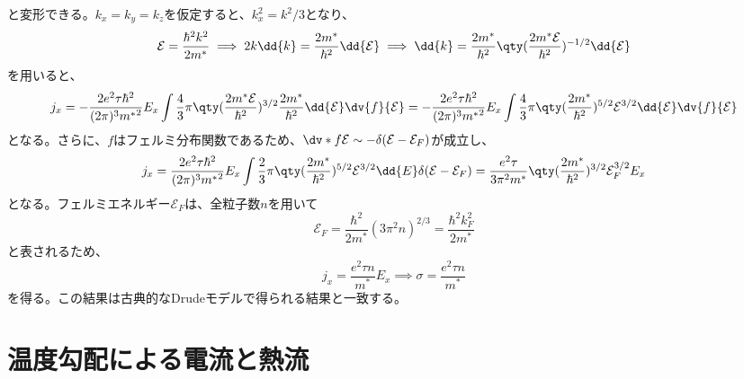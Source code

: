 と変形できる。$k_x=k_y=k_z$を仮定すると、$k_x^2 = k^2/3$となり、
\begin{equation}
	\mathcal{E} = \frac{\hbar^2k^2}{2m^*} \implies 2k\dd{k} = \frac{2m^*}{\hbar^2}\dd{\mathcal{E}} \implies \dd{k} = \frac{2m^*}{\hbar^2}\qty(\frac{2m^*\mathcal{E}}{\hbar^2})^{-1/2}\dd{\mathcal{E}}
\end{equation}
を用いると、
\begin{equation}
	j_x = -\frac{2e^2\tau\hbar^2}{(2\pi)^3{m^*}^2}E_x\int\frac{4}{3}\pi{}\qty(\frac{2m^*\mathcal{E}}{\hbar^2})^{3/2}\frac{2m^*}{\hbar^2}\dd{\mathcal{E}}\dv{f}{\mathcal{E}}
	= -\frac{2e^2\tau\hbar^2}{(2\pi)^3{m^*}^2}E_x\int\frac{4}{3}\pi{}\qty(\frac{2m^*}{\hbar^2})^{5/2}\mathcal{E}^{3/2}\dd{\mathcal{E}}\dv{f}{\mathcal{E}}
\end{equation}
となる。さらに、$f$はフェルミ分布関数であるため、$\dv*{f}{\mathcal{E}} \sim -\delta(\mathcal{E}-\mathcal{E}_{F})$が成立し、
\begin{equation}
	j_x = \frac{2e^2\tau\hbar^2}{(2\pi)^3{m^*}^2}E_x\int\frac{2}{3}\pi{}\qty(\frac{2m^*}{\hbar^2})^{5/2}\mathcal{E}^{3/2}\dd{E}\delta(\mathcal{E}-\mathcal{E}_F)
	= \frac{e^2\tau}{3\pi^2{m^*}}\qty(\frac{2m^*}{\hbar^2})^{3/2}\mathcal{E}_F^{3/2}E_x
\end{equation}
となる。フェルミエネルギー$\mathcal{E}_F$は、全粒子数$n$を用いて
\begin{equation}
	\mathcal{E}_F = \frac{\hbar^2}{2m^*}(3\pi^2n)^{2/3} = \frac{\hbar^2k_{F}^2}{2m^*}
\end{equation}
と表されるため、
\begin{equation}
	j_x = \frac{e^2\tau{}n}{m^*}E_x \implies \sigma = \frac{e^2\tau{}n}{m^*}
\end{equation}
を得る。この結果は古典的なDrudeモデルで得られる結果と一致する。




\section{温度勾配による電流と熱流}

